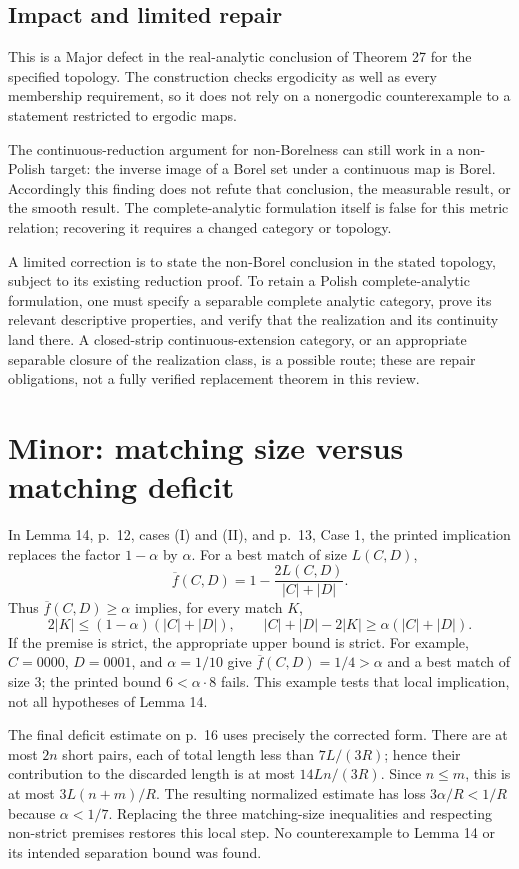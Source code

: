 \documentclass[10pt]{article}
\begin{document}
\subsection*{Impact and limited repair}
This is a Major defect in the real-analytic conclusion of Theorem 27 for the specified topology. The construction checks ergodicity as well as every membership requirement, so it does not rely on a nonergodic counterexample to a statement restricted to ergodic maps.\par
The continuous-reduction argument for non-Borelness can still work in a non-Polish target: the inverse image of a Borel set under a continuous map is Borel. Accordingly this finding does not refute that conclusion, the measurable result, or the smooth result. The complete-analytic formulation itself is false for this metric relation; recovering it requires a changed category or topology.\par
A limited correction is to state the non-Borel conclusion in the stated topology, subject to its existing reduction proof. To retain a Polish complete-analytic formulation, one must specify a separable complete analytic category, prove its relevant descriptive properties, and verify that the realization and its continuity land there. A closed-strip continuous-extension category, or an appropriate separable closure of the realization class, is a possible route; these are repair obligations, not a fully verified replacement theorem in this review.\par
\section*{Minor: matching size versus matching deficit}
In Lemma 14, p. 12, cases (I) and (II), and p. 13, Case 1, the printed implication replaces the factor \(1-\alpha\) by \(\alpha\). For a best match of size \(L(C,D)\), \[\overline f(C,D)=1-\frac{2L(C,D)}{|C|+|D|}.\] Thus \(\overline f(C,D)\ge\alpha\) implies, for every match \(K\), \[2|K|\le(1-\alpha)(|C|+|D|),
 \qquad |C|+|D|-2|K|\ge\alpha(|C|+|D|).\] If the premise is strict, the appropriate upper bound is strict. For example, \(C=0000\), \(D=0001\), and \(\alpha=1/10\) give \(\overline f(C,D)=1/4>\alpha\) and a best match of size \(3\); the printed bound \(6<\alpha\cdot8\) fails. This example tests that local implication, not all hypotheses of Lemma 14.\par
The final deficit estimate on p. 16 uses precisely the corrected form. There are at most \(2n\) short pairs, each of total length less than \(7L/(3R)\); hence their contribution to the discarded length is at most \(14Ln/(3R)\). Since \(n\le m\), this is at most \(3L(n+m)/R\). The resulting normalized estimate has loss \(3\alpha/R<1/R\) because \(\alpha<1/7\). Replacing the three matching-size inequalities and respecting non-strict premises restores this local step. No counterexample to Lemma 14 or its intended separation bound was found.\par
\end{document}
